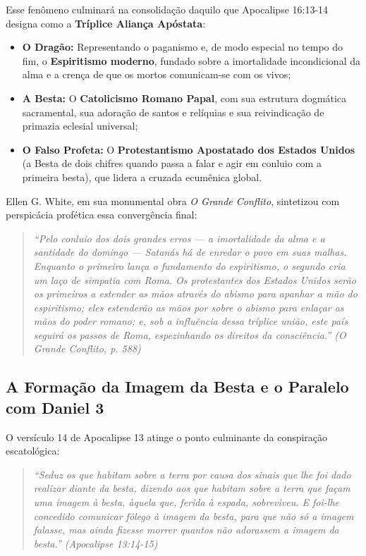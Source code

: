 \documentclass[11pt,a4paper,openany]{book}
\begin{document}
Esse fenômeno culminará na consolidação daquilo que Apocalipse 16:13-14 designa como a \textbf{Tríplice Aliança Apóstata}:

\begin{itemize}
  \item \textbf{O Dragão:} Representando o paganismo e, de modo especial no tempo do fim, o \textbf{Espiritismo moderno}, fundado sobre a imortalidade incondicional da alma e a crença de que os mortos comunicam-se com os vivos;
  \item \textbf{A Besta:} O \textbf{Catolicismo Romano Papal}, com sua estrutura dogmática sacramental, sua adoração de santos e relíquias e sua reivindicação de primazia eclesial universal;
  \item \textbf{O Falso Profeta:} O \textbf{Protestantismo Apostatado dos Estados Unidos} (a Besta de dois chifres quando passa a falar e agir em conluio com a primeira besta), que lidera a cruzada ecumênica global.
\end{itemize}


Ellen G. White, em sua monumental obra \textit{O Grande Conflito}, sintetizou com perspicácia profética essa convergência final:


\begin{quote}
\itshape \textit{``Pelo conluio dos dois grandes erros — a imortalidade da alma e a santidade do domingo — Satanás há de enredar o povo em suas malhas. Enquanto o primeiro lança o fundamento do espiritismo, o segundo cria um laço de simpatia com Roma. Os protestantes dos Estados Unidos serão os primeiros a estender as mãos através do abismo para apanhar a mão do espiritismo; eles estenderão as mãos por sobre o abismo para enlaçar as mãos do poder romano; e, sob a influência dessa tríplice união, este país seguirá os passos de Roma, espezinhando os direitos da consciência.''} (\textit{O Grande Conflito}, p. 588)
\end{quote}




\subsection{A Formação da Imagem da Besta e o Paralelo com Daniel 3}


O versículo 14 de Apocalipse 13 atinge o ponto culminante da conspiração escatológica:


\begin{quote}
\itshape \textit{``Seduz os que habitam sobre a terra por causa dos sinais que lhe foi dado realizar diante da besta, dizendo aos que habitam sobre a terra que façam uma imagem à besta, àquela que, ferida à espada, sobreviveu. E foi-lhe concedido comunicar fôlego à imagem da besta, para que não só a imagem falasse, mas ainda fizesse morrer quantos não adorassem a imagem da besta.''} (Apocalipse 13:14-15)
\end{quote}
\end{document}
